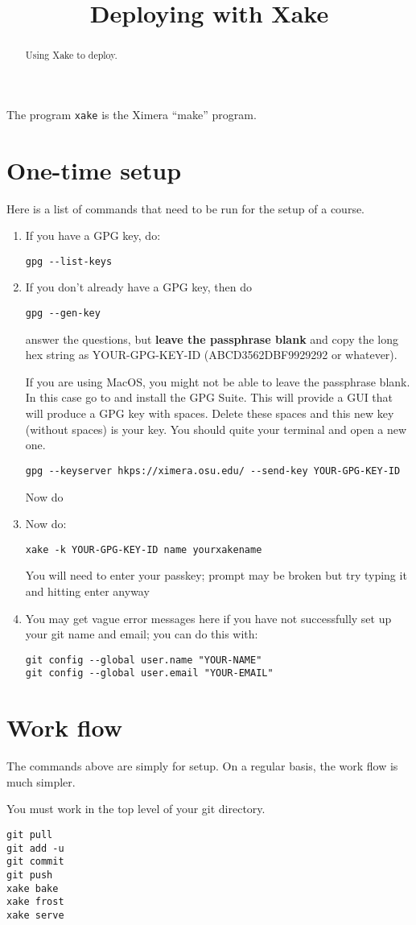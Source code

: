 \documentclass{ximera}
\title{Deploying with Xake}
\begin{document}
\begin{abstract}
Using Xake to deploy.
\end{abstract}
\maketitle

The program \verb|xake| is the Ximera ``make'' program.

\section{One-time setup}

Here is a list of commands that need to be run for the setup of a course. 

\begin{enumerate}
\item If you have a GPG key, do:
\begin{verbatim}
gpg --list-keys
\end{verbatim}
\item If you don’t already have a GPG key, then do
\begin{verbatim}
gpg --gen-key
\end{verbatim}
answer the questions, but \textbf{leave the passphrase blank} and copy
the long hex string as YOUR-GPG-KEY-ID (ABCD3562DBF9929292 or
whatever).

If you are using MacOS, you might not be able to leave the passphrase
blank. In this case go to  and install the
GPG Suite.  This will provide a GUI that will produce a GPG key with
spaces. Delete these spaces and this new key (without spaces) is your
key. You should quite your terminal and open a new one.

\begin{verbatim}
gpg --keyserver hkps://ximera.osu.edu/ --send-key YOUR-GPG-KEY-ID
\end{verbatim}
Now do
\item Now do: 
\begin{verbatim}
xake -k YOUR-GPG-KEY-ID name yourxakename
\end{verbatim}
You will need to enter your passkey; prompt may be broken but try typing it and hitting enter anyway

\item You may get vague error messages here if you have not successfully set up your git name and email; you can do this with:
\begin{verbatim}
git config --global user.name "YOUR-NAME"
git config --global user.email "YOUR-EMAIL"
\end{verbatim}
\end{enumerate}


\section{Work flow}

The commands above are simply for setup. On a regular basis, the work flow is much simpler.

You must work in the top level of your git directory.
\begin{verbatim}
git pull
git add -u
git commit
git push
xake bake
xake frost
xake serve
\end{verbatim}




  
\end{document}

